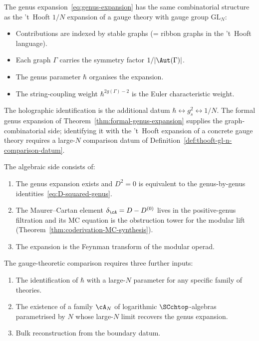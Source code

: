 \begin{remark}
\label{rem:thooft-formal}
The genus expansion~\eqref{eq:genus-expansion} has the same
combinatorial structure as the 't~Hooft $1/N$ expansion of a
gauge theory with gauge group $\mathrm{GL}_N$:
\begin{itemize}
\item Contributions are indexed by stable graphs (= ribbon graphs
 in the 't~Hooft language).
\item Each graph $\Gamma$ carries the symmetry factor
 $1/|\Aut(\Gamma)|$.
\item The genus parameter $\hbar$ organises the expansion.
\item The string-coupling weight $\hbar^{2g(\Gamma)-2}$ is the
 Euler characteristic weight.
\end{itemize}
The holographic identification is the additional datum
\(\hbar \leftrightarrow g_s^2 \leftrightarrow 1/N\). The formal genus
expansion of Theorem~\ref{thm:formal-genus-expansion} supplies the
graph-combinatorial side; identifying it with the 't~Hooft expansion of
a concrete gauge theory requires a large-$N$ comparison datum of
Definition~\ref{def:thooft-gl-n-comparison-datum}.
\end{remark}

\begin{remark}
\label{rem:thooft-not-proved}
The algebraic side consists of:
\begin{enumerate}[leftmargin=2.4em]
\item The genus expansion exists and $D^2 = 0$ is equivalent to
 the genus-by-genus identities~\eqref{eq:D-squared-genus}.
\item The Maurer--Cartan element $\delta_\cA = D - D^{(0)}$
 lives in the positive-genus filtration and its MC equation is the
 obstruction tower for the modular lift
 (Theorem~\ref{thm:coderivation-MC-synthesis}).
\item The expansion is the Feynman transform of the modular operad.
\end{enumerate}
The gauge-theoretic comparison requires three further inputs:
\begin{enumerate}[leftmargin=2.4em]
\item The identification of $\hbar$ with a large-$N$ parameter for
 any specific family of theories.
\item The existence of a family $\cA_N$ of logarithmic
 $\SCchtop$-algebras parametrised by $N$ whose large-$N$ limit
 recovers the genus expansion.
\item Bulk reconstruction from the boundary datum.
\end{enumerate}
\end{remark}

